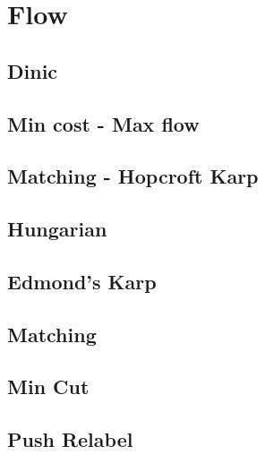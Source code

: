 \newpage
\section{Flow}
\subsection{Dinic}

\subsection{Min cost - Max flow}

\subsection{Matching - Hopcroft Karp}

\subsection{Hungarian}


\subsection{Edmond's Karp}

\newpage
\subsection{Matching}


\subsection{Min Cut}

\newpage
\subsection{Push Relabel}

